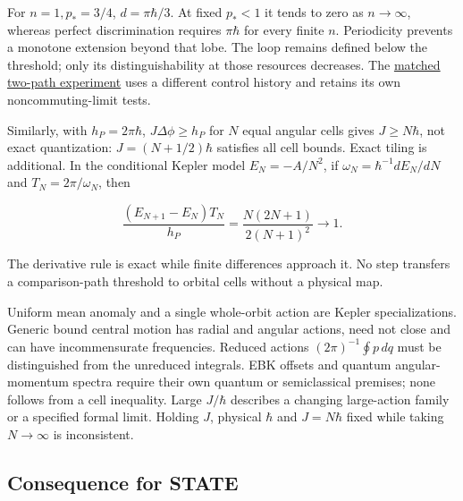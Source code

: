 \documentclass[11pt,a4paper]{article}
\begin{document}
For \(n=1,p_*=3/4\), \(d=\pi\hbar/3\). At fixed \(p_*<1\) it tends to
zero as \(n\to\infty\), whereas perfect discrimination requires
\(\pi\hbar\) for every finite \(n\). Periodicity prevents a monotone
extension beyond that lobe. The loop remains defined below the
threshold; only its distinguishability at those resources decreases. The
\href{galileo-two-path-interference.md}{matched two-path experiment}
uses a different control history and retains its own noncommuting-limit
tests.

Similarly, with \(h_P=2\pi\hbar\), \(J\Delta\phi\ge h_P\) for \(N\)
equal angular cells gives \(J\ge N\hbar\), not exact quantization:
\(J=(N+1/2)\hbar\) satisfies all cell bounds. Exact tiling is
additional. In the conditional Kepler model \(E_N=-A/N^2\), if
\(\omega_N=\hbar^{-1}dE_N/dN\) and \(T_N=2\pi/\omega_N\), then

\[\frac{(E_{N+1}-E_N)T_N}{h_P}
 =\frac{N(2N+1)}{2(N+1)^2}\longrightarrow1.\]

The derivative rule is exact while finite differences approach it. No
step transfers a comparison-path threshold to orbital cells without a
physical map.

Uniform mean anomaly and a single whole-orbit action are Kepler
specializations. Generic bound central motion has radial and angular
actions, need not close and can have incommensurate frequencies. Reduced
actions \((2\pi)^{-1}\oint p\,dq\) must be distinguished from the
unreduced integrals. EBK offsets and quantum angular-momentum spectra
require their own quantum or semiclassical premises; none follows from a
cell inequality. Large \(J/\hbar\) describes a changing large-action
family or a specified formal limit. Holding \(J\), physical \(\hbar\)
and \(J=N\hbar\) fixed while taking \(N\to\infty\) is inconsistent.

\subsection{Consequence for STATE}\label{consequence-for-state}
\end{document}
